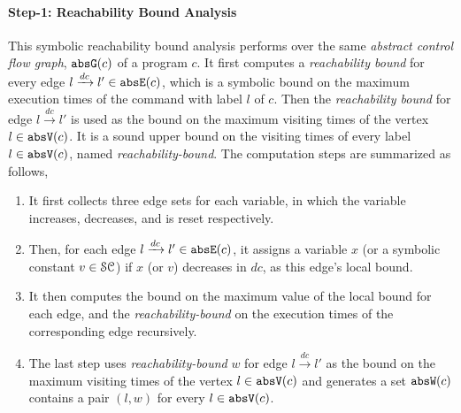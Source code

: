\paragraph{Step-1: Reachability Bound Analysis}
This symbolic reachability bound analysis performs over the same \emph{abstract control flow graph}, $\mathtt{abs}{\mathtt{G}}(c)$ of a program $c$. 
It first computes a \emph{reachability bound} for every edge $l \xrightarrow{dc} l' \in \mathtt{abs}{\mathtt{E}}(c)$,
which is a symbolic bound on the maximum execution times of the command with label $l$ of $c$.
Then the \emph{reachability bound} for edge $l \xrightarrow{dc} l'$ is used as the bound on the maximum visiting times of the vertex $l \in \mathtt{abs}{\mathtt{V}}(c)$.
It is a sound upper bound on the visiting times
of every label $l \in \mathtt{abs}{\mathtt{V}}(c)$, named \emph{reachability-bound}.
The computation steps are 
summarized as follows,
\begin{enumerate}
 \item It first collects three edge sets for each variable,
in which the variable increases, decreases, and is reset respectively.
\item
Then, for each edge $l \xrightarrow{dc} l' \in \mathtt{abs}{\mathtt{E}}(c)$, it assigns a variable $x$ (or a symbolic constant $v \in \mathcal{SC}$) if $x$ (or $v$) decreases in $dc$, as this edge's local bound.
\item
It then computes the bound on the maximum value of the local bound for each edge,
and the \emph{reachability-bound} on the execution
times of the corresponding edge recursively.
\item The last step uses \emph{reachability-bound} $w$ for edge $l \xrightarrow{dc} l'$ as the bound on the maximum visiting times of the vertex $l \in \mathtt{abs}{\mathtt{V}}(c)$ and generates a set $\mathtt{abs}{\mathtt{W}}(c)$ contains a pair $(l, w)$ for every $l \in \mathtt{abs}{\mathtt{V}}(c)$.
\end{enumerate}

